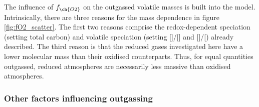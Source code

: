 \documentclass[3p,authoryear]{elsarticle}
\begin{document}
The influence of $f_{\ch{O2}}$ on the outgassed volatile masses is built into the model. Intrinsically, there are three reasons for the mass dependence in figure \ref{fig:fO2_scatter}. The first two reasons comprise the redox-dependent speciation (setting total carbon) and volatile speciation (setting []/[] and []/[\ch{CO]}) already described. The third reason is that the reduced gases investigated here have a lower molecular mass than their oxidised counterparts. Thus, for equal quantities outgassed, reduced atmospheres are necessarily less massive than oxidised atmospheres. 




\subsubsection{Other factors influencing outgassing}
\end{document}
